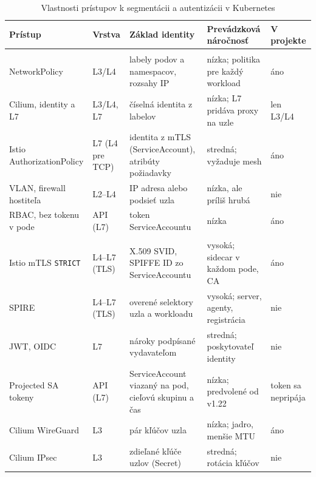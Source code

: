 \begin{table}[ht!]
  \centering
  \caption{Vlastnosti prístupov k segmentácii a autentizácii v Kubernetes}
  \label{tab:approaches}
  \footnotesize
  \renewcommand{\arraystretch}{1.15}
  \begin{tabularx}{\textwidth}{@{}>{\raggedright\arraybackslash}p{2.9cm}
      >{\raggedright\arraybackslash}p{1.5cm}
      >{\raggedright\arraybackslash}X
      >{\raggedright\arraybackslash}p{3.1cm}
      >{\raggedright\arraybackslash}p{2.0cm}@{}}
    \toprule
    Prístup & Vrstva & Základ identity & Prevádzková náročnosť & V projekte \\
    \midrule
    \multicolumn{5}{@{}l}{\emph{Segmentácia a autorizácia}} \\
    NetworkPolicy & L3/L4 & labely podov a namespacov, rozsahy IP & nízka; politika pre každý workload & áno \\
    Cilium, identity a L7 & L3/L4, L7 & číselná identita z labelov & nízka; L7 pridáva proxy na uzle & len L3/L4 \\
    Istio AuthorizationPolicy & L7 (L4 pre TCP) & identita z mTLS (ServiceAccount), atribúty požiadavky & stredná; vyžaduje mesh & áno \\
    VLAN, firewall hostiteľa & L2--L4 & IP adresa alebo podsieť uzla & nízka, ale príliš hrubá & nie \\
    RBAC, bez tokenu v pode & API (L7) & token ServiceAccountu & nízka & áno \\
    \midrule
    \multicolumn{5}{@{}l}{\emph{Šifrovanie a autentizácia prenosu}} \\
    Istio mTLS \texttt{STRICT} & L4--L7 (TLS) & X.509 SVID, SPIFFE ID zo ServiceAccountu & vysoká; sidecar v každom pode, CA & áno \\
    SPIRE & L4--L7 (TLS) & overené selektory uzla a workloadu & vysoká; server, agenty, registrácia & nie \\
    JWT, OIDC & L7 & nároky podpísané vydavateľom & stredná; poskytovateľ identity & nie \\
    Projected SA tokeny & API (L7) & ServiceAccount viazaný na pod, cieľovú skupinu a čas & nízka; predvolené od v1.22 & token sa nepripája \\
    Cilium WireGuard & L3 & pár kľúčov uzla & nízka; jadro, menšie MTU & áno \\
    Cilium IPsec & L3 & zdieľané kľúče uzlov (Secret) & stredná; rotácia kľúčov & nie \\
    \bottomrule
  \end{tabularx}
\end{table}

